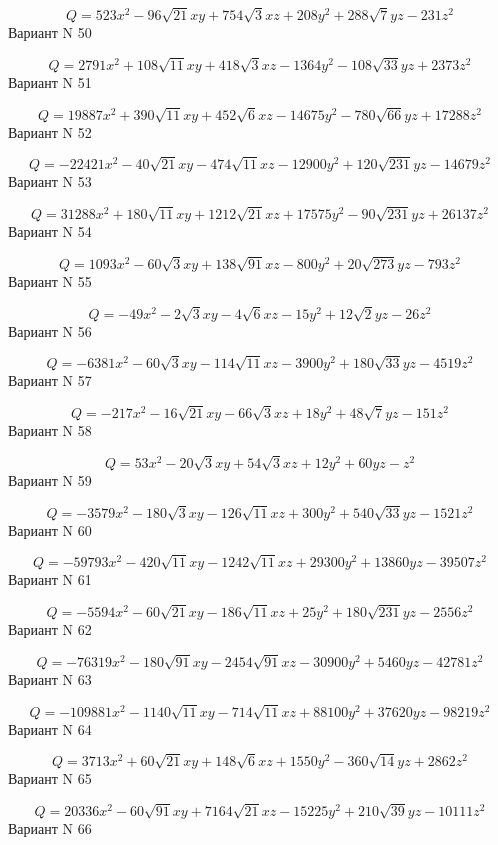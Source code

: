 \documentclass[11pt]{report}
\begin{document}
$$Q = 523 x^{2} - 96 \sqrt{21} x y + 754 \sqrt{3} x z + 208 y^{2} + 288 \sqrt{7} y z - 231 z^{2}$$Вариант N 50

$$Q = 2791 x^{2} + 108 \sqrt{11} x y + 418 \sqrt{3} x z - 1364 y^{2} - 108 \sqrt{33} y z + 2373 z^{2}$$Вариант N 51

$$Q = 19887 x^{2} + 390 \sqrt{11} x y + 452 \sqrt{6} x z - 14675 y^{2} - 780 \sqrt{66} y z + 17288 z^{2}$$Вариант N 52

$$Q = - 22421 x^{2} - 40 \sqrt{21} x y - 474 \sqrt{11} x z - 12900 y^{2} + 120 \sqrt{231} y z - 14679 z^{2}$$Вариант N 53

$$Q = 31288 x^{2} + 180 \sqrt{11} x y + 1212 \sqrt{21} x z + 17575 y^{2} - 90 \sqrt{231} y z + 26137 z^{2}$$Вариант N 54

$$Q = 1093 x^{2} - 60 \sqrt{3} x y + 138 \sqrt{91} x z - 800 y^{2} + 20 \sqrt{273} y z - 793 z^{2}$$Вариант N 55

$$Q = - 49 x^{2} - 2 \sqrt{3} x y - 4 \sqrt{6} x z - 15 y^{2} + 12 \sqrt{2} y z - 26 z^{2}$$Вариант N 56

$$Q = - 6381 x^{2} - 60 \sqrt{3} x y - 114 \sqrt{11} x z - 3900 y^{2} + 180 \sqrt{33} y z - 4519 z^{2}$$Вариант N 57

$$Q = - 217 x^{2} - 16 \sqrt{21} x y - 66 \sqrt{3} x z + 18 y^{2} + 48 \sqrt{7} y z - 151 z^{2}$$Вариант N 58

$$Q = 53 x^{2} - 20 \sqrt{3} x y + 54 \sqrt{3} x z + 12 y^{2} + 60 y z - z^{2}$$Вариант N 59

$$Q = - 3579 x^{2} - 180 \sqrt{3} x y - 126 \sqrt{11} x z + 300 y^{2} + 540 \sqrt{33} y z - 1521 z^{2}$$Вариант N 60

$$Q = - 59793 x^{2} - 420 \sqrt{11} x y - 1242 \sqrt{11} x z + 29300 y^{2} + 13860 y z - 39507 z^{2}$$Вариант N 61

$$Q = - 5594 x^{2} - 60 \sqrt{21} x y - 186 \sqrt{11} x z + 25 y^{2} + 180 \sqrt{231} y z - 2556 z^{2}$$Вариант N 62

$$Q = - 76319 x^{2} - 180 \sqrt{91} x y - 2454 \sqrt{91} x z - 30900 y^{2} + 5460 y z - 42781 z^{2}$$Вариант N 63

$$Q = - 109881 x^{2} - 1140 \sqrt{11} x y - 714 \sqrt{11} x z + 88100 y^{2} + 37620 y z - 98219 z^{2}$$Вариант N 64

$$Q = 3713 x^{2} + 60 \sqrt{21} x y + 148 \sqrt{6} x z + 1550 y^{2} - 360 \sqrt{14} y z + 2862 z^{2}$$Вариант N 65

$$Q = 20336 x^{2} - 60 \sqrt{91} x y + 7164 \sqrt{21} x z - 15225 y^{2} + 210 \sqrt{39} y z - 10111 z^{2}$$Вариант N 66
\end{document}
